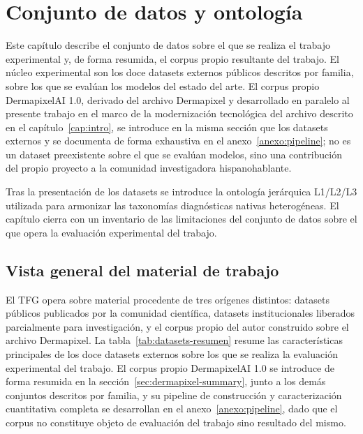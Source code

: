 
\chapter{Conjunto de datos y ontología}
\label{cap:datos}

Este capítulo describe el conjunto de datos sobre el que se realiza
el trabajo experimental y, de forma resumida, el corpus propio
resultante del trabajo. El núcleo experimental son los doce datasets
externos públicos descritos por familia, sobre los que se evalúan
los modelos del estado del arte. El corpus propio DermapixelAI 1.0,
derivado del archivo Dermapixel y desarrollado en paralelo al
presente trabajo en el marco de la modernización tecnológica del
archivo descrito en el capítulo~\ref{cap:intro}, se introduce en la
misma sección que los datasets externos y se documenta de forma
exhaustiva en el anexo~\ref{anexo:pipeline}; no es un dataset
preexistente sobre el que se evalúan modelos, sino una contribución
del propio proyecto a la comunidad investigadora hispanohablante.

Tras la presentación de los datasets se introduce la ontología
jerárquica L1/L2/L3 utilizada para armonizar las taxonomías
diagnósticas nativas heterogéneas. El capítulo cierra con un
inventario de las limitaciones del conjunto de datos sobre el que
opera la evaluación experimental del trabajo.

\section{Vista general del material de trabajo}
\label{sec:vista-general-datos}

El TFG opera sobre material procedente de tres orígenes distintos:
datasets públicos publicados por la comunidad científica, datasets
institucionales liberados parcialmente para investigación, y el
corpus propio del autor construido sobre el archivo Dermapixel. La
tabla~\ref{tab:datasets-resumen} resume las características
principales de los doce datasets externos sobre los que se realiza
la evaluación experimental del trabajo. El corpus propio
DermapixelAI 1.0 se introduce de forma resumida en la
sección~\ref{sec:dermapixel-summary}, junto a los demás conjuntos
descritos por familia, y su pipeline de construcción y
caracterización cuantitativa completa se desarrollan en el
anexo~\ref{anexo:pipeline}, dado que el corpus no constituye objeto
de evaluación del trabajo sino resultado del mismo.

